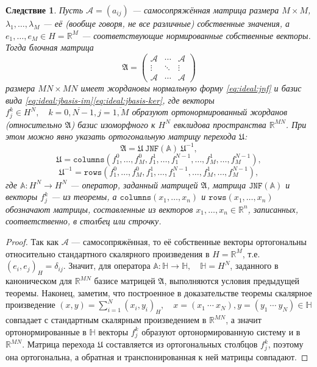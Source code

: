\documentclass{article}
\newtheorem{corollary}{Следствие }
\begin{document}
 \begin{corollary}
     Пусть \( \mathcal{A} = (a_{ij}) \) --- самосопряжённая матрица размера \( M\times M \),
     \( \lambda_1, \ldots, \lambda_M \) --- её (вообще говоря, не все различные) собственные значения,
     а \( e_1, \ldots, e_M \in H=\mathbb{R}^M \) --- соответствующие нормированные собственные векторы.
     Тогда блочная матрица
     \[ \mathfrak{A} = \begin{pmatrix}
         \mathcal{A} & \cdots & \mathcal{A} \\
         \vdots & \ddots & \vdots \\
         \mathcal{A} & \cdots & \mathcal{A}
     \end{pmatrix} \]
     размера \( MN\times MN \) имеет жордановы нормальную форму \eqref{eq:ideal:jnf}
     и базис вида \eqref{eq:ideal:jbasis-im}\eqref{eq:ideal:jbasis-ker},
     где векторы \( f_j^k\in H^N,\quad k=\overline{0,N-1},j=\overline{1,M} \)
     образуют ортонормированный жорданов (относительно \( \mathfrak{A} \))
     базис изоморфного к \( H^N \) евклидова пространства \( \mathbb{R}^{MN} \).
     При этом можно явно указать ортогональную матрицу перехода \( \mathfrak{U} \):
     \[
         \mathfrak{A} = \mathfrak{U} ~ \mathtt{JNF}(\mathbb{A}) ~ \mathfrak{U}^{-1}, \]
    \[ \mathfrak{U} = \mathtt{columns}(f_1^0,\ldots,f_M^0,f_1^1,\ldots,f_1^{N-1},\ldots,f_M^1,\ldots,f_M^{N-1}), \]
    \[ \mathfrak{U}^{-1} = \mathtt{rows}(f_1^0,\ldots,f_M^0,f_1^1,\ldots,f_1^{N-1},\ldots,f_M^1,\ldots,f_M^{N-1}), \]
     где \( \mathbb{A}:H^N\to H^N \) --- оператор, заданный матрицей \( \mathfrak{A} \),
     матрица \( \mathtt{JNF(\mathbb{A})} \) и векторы \( f_j^k \) --- из теоремы,
     а \( \mathtt{columns}(x_1,\ldots,x_n) \) и \( \mathtt{rows}(x_1,\ldots,x_n) \) обозначают матрицы,
     составленные из векторов \( x_1, \ldots, x_n \in \mathbb{R}^n \),
     записанных, соответственно, в столбец или строчку.
 \end{corollary}
 \begin{proof}
     Так как \( \mathcal{A} \) --- самосопряжённая,
     то её собственные векторы ортогональны относительно стандартного скалярного произведения в \( H=\mathbb{R}^M \),
     т.е. \( (e_i, e_j)_H = \delta_{ij} \).
     Значит, для оператора \( \mathbb{A}:\mathbb{H}\to\mathbb{H}, \quad \mathbb{H}=H^N \),
     заданного в каноническом для \( \mathbb{R}^{MN} \) базисе матрицей \( \mathfrak{A} \),
     выполняются условия предыдущей теоремы.
     Наконец, заметим, что построенное в доказательстве теоремы
     скалярное произведение \( (x,y) = \sum_{i=1}^N (x_i, y_i)_H, \quad x=(x_1~\cdots~x_N),y=(y_1~\cdots~y_N)\in\mathbb{H} \)
     совпадает с стандартным скалярным произведением в \( \mathbb{R}^{MN} \),
     а значит ортонормированные в \( \mathbb{H} \) векторы \( f_j^k \)
     образуют ортонормированную систему и в \( \mathbb{R}^{MN} \).
     Матрица перехода \( \mathfrak{U} \) составляется из ортогональных столбцов \( f_j^k \),
     поэтому она ортогональна, а обратная и транспонированная к ней матрицы совпадают.
 \end{proof}
\end{document}
